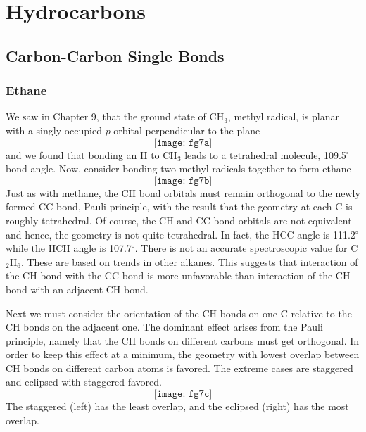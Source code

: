 \chapter{Hydrocarbons}

\section{Carbon-Carbon Single Bonds}

\subsection{Ethane}

We saw in Chapter 9, that the ground state of CH$_3$, methyl radical, 
is planar with a singly occupied $p$ orbital perpendicular to the plane
\begin{equation}
\texttt{[image: fg7a]}
\label{chap7-eqno1}
\end{equation}
and we found that bonding an H to CH$_3$ leads to a tetrahedral 
molecule, 109.5$^{\circ}$ bond angle.  Now, consider bonding two methyl 
radicals together to form ethane
\begin{equation}
\texttt{[image: fg7b]}
\label{chap7-eqno2}
\end{equation}
Just as with methane, the CH bond orbitals must remain orthogonal to
the newly formed CC bond, Pauli principle, with the result that the
geometry at each C is roughly tetrahedral.  Of course, the CH and CC
bond orbitals are not equivalent and hence, the geometry is not quite
tetrahedral.  In fact, the HCC angle is 111.2$^{\circ}$ while the HCH
angle is 107.7$^{\circ}$.  There is not an accurate spectroscopic
value for C$_2$H$_6$.  These are based on trends in other alkanes.
This suggests that interaction of the CH bond with the CC bond is more
unfavorable than interaction of the CH bond with an adjacent CH bond.

Next we must consider the orientation of the CH bonds on one C 
relative to the CH bonds on the adjacent one.  The dominant effect 
arises from the Pauli principle, namely that the CH bonds on 
different carbons must get orthogonal. In order to keep this 
effect at a minimum, the geometry with lowest overlap between 
CH bonds on different carbon atoms is favored.  The extreme 
cases are staggered and eclipsed with staggered favored.
\begin{equation}
\texttt{[image: fg7c]}
\label{chap7-eqno3}
\end{equation}
The staggered (left) has the least overlap, and the eclipsed (right)
has the most overlap.

